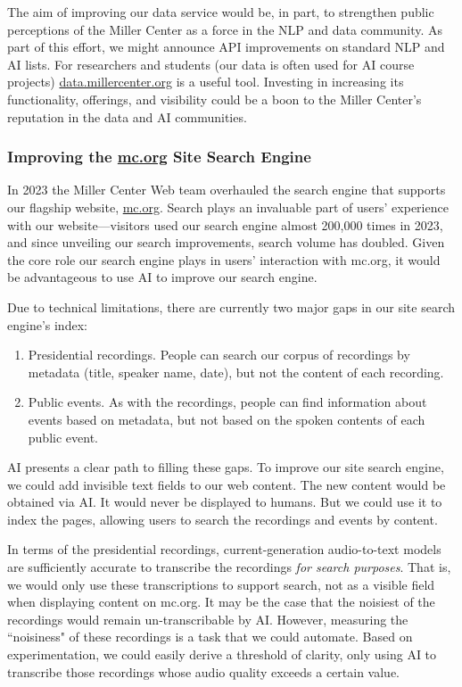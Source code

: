 \documentclass[12pt, oneside]{article}   	%
\begin{document}
The aim of improving our data service would be, in part, to strengthen public perceptions of the Miller Center as a force in the NLP and data community.  As part of this effort, we might announce API improvements on standard NLP and AI lists.  For researchers and students (our data is often used for AI course projects) \href{https://data.millercenter.org}{data.millercenter.org} is a useful tool.  Investing in increasing its functionality, offerings, and visibility could be a boon to the Miller Center's reputation in the data and AI communities.



\subsubsection{Improving the \href{https://millercenter.org}{mc.org} Site Search Engine}\label{section.applications.easy.sitesearch}
In 2023 the Miller Center Web team overhauled the search engine that supports our flagship website, \href{https://millercenter.org}{mc.org}.  Search plays an invaluable part of users' experience with our website---visitors used our search engine almost 200,000 times in 2023, and since unveiling our search improvements, search volume has doubled.  Given the core role our search engine plays in users' interaction with mc.org, it would be advantageous to use AI to improve our search engine.

Due to technical limitations, there are currently two major gaps in our site search engine's index:
\begin{enumerate}
\item Presidential recordings.  People can search our corpus of recordings by metadata (title, speaker name, date), but not the content of each recording.  
\item Public events.  As with the recordings, people can find information about events based on metadata, but not based on the spoken contents of each public event.
\end{enumerate}
AI presents a clear path to filling these gaps.  To improve our site search engine, we could add invisible text fields to our web content.  The new content would be obtained via AI.  It would never be displayed to humans.  But we could use it to index the pages, allowing users to search the recordings and events by content.

In terms of the presidential recordings, current-generation audio-to-text models are sufficiently accurate to transcribe the recordings \emph{for search purposes}.  That is, we would only use these transcriptions to support search, not as a visible field when displaying content on mc.org.  It may be the case that the noisiest of the recordings would remain un-transcribable by AI.  However, measuring the ``noisiness" of these recordings is a  task that we could automate.  Based on experimentation, we could easily derive a threshold of clarity, only using AI to transcribe those recordings whose audio quality exceeds a certain value.
\end{document}
